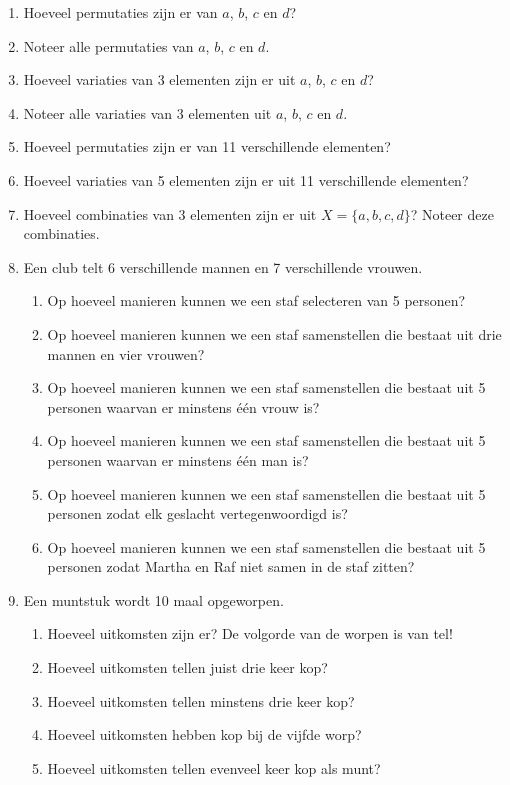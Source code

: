 \begin{enumerate}
\item Hoeveel permutaties zijn er van $a$, $b$, $c$ en $d$?
\item Noteer alle permutaties van $a$, $b$, $c$ en $d$.
\item Hoeveel variaties van 3 elementen zijn er uit $a$, $b$, $c$ en $d$?
\item Noteer alle variaties van 3 elementen uit $a$, $b$, $c$ en $d$.
\item Hoeveel permutaties zijn er van 11 verschillende elementen?
\item Hoeveel variaties van 5 elementen zijn er uit 11 verschillende elementen?
\item Hoeveel combinaties van 3 elementen zijn er uit $X=\{a,b,c,d\}$?
Noteer deze combinaties.
\item Een club telt 6 verschillende mannen en 7 verschillende vrouwen.
\begin{enumerate}
\item Op hoeveel manieren kunnen we een staf selecteren van 5 personen?
\item Op hoeveel manieren kunnen we een staf samenstellen die bestaat uit drie mannen en vier vrouwen?
\item Op hoeveel manieren kunnen we een staf samenstellen die bestaat uit 5 personen waarvan er minstens één vrouw is?
\item Op hoeveel manieren kunnen we een staf samenstellen die bestaat uit 5 personen waarvan er minstens één man is?
\item Op hoeveel manieren kunnen we een staf samenstellen die bestaat uit 5 personen zodat elk geslacht vertegenwoordigd is?
\item  Op hoeveel manieren kunnen we een staf samenstellen die bestaat uit 5 personen zodat Martha en Raf niet samen in de staf zitten?
\end{enumerate}
\item Een muntstuk wordt 10 maal opgeworpen.
\begin{enumerate}
\item Hoeveel uitkomsten zijn er? De volgorde van de worpen is van tel!
 \item Hoeveel uitkomsten tellen juist drie keer kop?
 \item Hoeveel uitkomsten tellen minstens drie keer kop?
 \item Hoeveel uitkomsten hebben kop bij de vijfde worp?
 \item Hoeveel uitkomsten tellen evenveel keer kop als munt?
\end{enumerate}

\end{enumerate}


